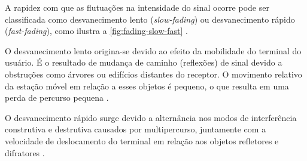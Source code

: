 \begin{figure}[H]
	\centering
\end{figure}

A rapidez com que as flutuações na intensidade do sinal ocorre pode ser classificada como desvanecimento lento (\textit{slow-fading}) ou desvanecimento rápido (\textit{fast-fading}), como ilustra a \autoref{fig:fading-slow-fast} \cite{haykin2008}.

O desvanecimento lento origina-se devido ao efeito da mobilidade do terminal do usuário. É o resultado de mudança de caminho (reflexões) de sinal devido a obstruções como árvores ou edifícios distantes do receptor. O movimento relativo da estação móvel em relação a esses objetos é pequeno, o que resulta em uma perda de percurso pequena \cite{haykin2008}.

O desvanecimento rápido surge devido a alternância nos modos de interferência construtiva e destrutiva causados por multipercurso, juntamente com a velocidade de deslocamento do terminal em relação aos objetos refletores e difratores \cite{haykin2008}.

\begin{figure}[H]
	\centering
\end{figure}

